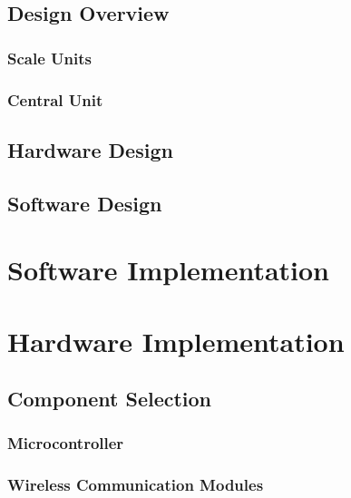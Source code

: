 \documentclass{l3proj}
\begin{document}
\section{Design Overview}



\subsection{Scale Units}
\label{sec:scale}


\subsection{Central Unit}
\label{sec:central}


\section{Hardware Design}



\section{Software Design}

\chapter{Software Implementation}
\label{chap:software impl}

\chapter{Hardware Implementation}


\section{Component Selection}

\subsection{Microcontroller}


\subsection{Wireless Communication Modules}

\end{document}
